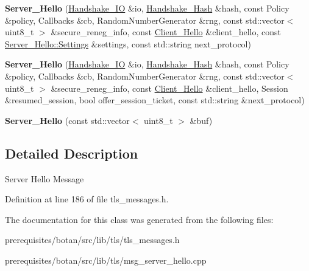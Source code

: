 \begin{DoxyCompactItemize}
\item 
\mbox{\label{class_botan_1_1_t_l_s_1_1_server___hello_a82204a2faf1ca574f88c51f70b0bb582}} 
{\bfseries Server\+\_\+\+Hello} (\mbox{\hyperlink{class_botan_1_1_t_l_s_1_1_handshake___i_o}{Handshake\+\_\+\+IO}} \&io, \mbox{\hyperlink{class_botan_1_1_t_l_s_1_1_handshake___hash}{Handshake\+\_\+\+Hash}} \&hash, const Policy \&policy, Callbacks \&cb, Random\+Number\+Generator \&rng, const std\+::vector$<$ uint8\+\_\+t $>$ \&secure\+\_\+reneg\+\_\+info, const \mbox{\hyperlink{class_botan_1_1_t_l_s_1_1_client___hello}{Client\+\_\+\+Hello}} \&client\+\_\+hello, const \mbox{\hyperlink{class_botan_1_1_t_l_s_1_1_server___hello_1_1_settings}{Server\+\_\+\+Hello\+::\+Settings}} \&settings, const std\+::string next\+\_\+protocol)
\item 
\mbox{\label{class_botan_1_1_t_l_s_1_1_server___hello_a0cabbc32c43de6c7e8614075db6ca5f3}} 
{\bfseries Server\+\_\+\+Hello} (\mbox{\hyperlink{class_botan_1_1_t_l_s_1_1_handshake___i_o}{Handshake\+\_\+\+IO}} \&io, \mbox{\hyperlink{class_botan_1_1_t_l_s_1_1_handshake___hash}{Handshake\+\_\+\+Hash}} \&hash, const Policy \&policy, Callbacks \&cb, Random\+Number\+Generator \&rng, const std\+::vector$<$ uint8\+\_\+t $>$ \&secure\+\_\+reneg\+\_\+info, const \mbox{\hyperlink{class_botan_1_1_t_l_s_1_1_client___hello}{Client\+\_\+\+Hello}} \&client\+\_\+hello, Session \&resumed\+\_\+session, bool offer\+\_\+session\+\_\+ticket, const std\+::string \&next\+\_\+protocol)
\item 
\mbox{\label{class_botan_1_1_t_l_s_1_1_server___hello_a7e146c79f28f006242198f67ba9d5f82}} 
{\bfseries Server\+\_\+\+Hello} (const std\+::vector$<$ uint8\+\_\+t $>$ \&buf)
\end{DoxyCompactItemize}


\subsection{Detailed Description}
Server Hello Message 

Definition at line 186 of file tls\+\_\+messages.\+h.



The documentation for this class was generated from the following files\+:\begin{DoxyCompactItemize}
\item 
prerequisites/botan/src/lib/tls/tls\+\_\+messages.\+h\item 
prerequisites/botan/src/lib/tls/msg\+\_\+server\+\_\+hello.\+cpp\end{DoxyCompactItemize}
